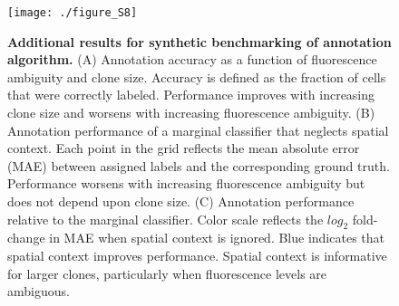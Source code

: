 \begin{figure}[h]
\texttt{[image: ./figure\_S8]}
\caption[Additional results for synthetic benchmarking of annotation algorithm.]{\textbf{Additional results for synthetic benchmarking of annotation algorithm.} (A) Annotation accuracy as a function of fluorescence ambiguity and clone size. Accuracy is defined as the fraction of cells that were correctly labeled. Performance improves with increasing clone size and worsens with increasing fluorescence ambiguity. (B) Annotation performance of a marginal classifier that neglects spatial context. Each point in the grid reflects the mean absolute error (MAE) between assigned labels and the corresponding ground truth. Performance worsens with increasing fluorescence ambiguity but does not depend upon clone size. (C) Annotation performance relative to the marginal classifier. Color scale reflects the $log_2$ fold-change in MAE when spatial context is ignored. Blue indicates that spatial context improves performance. Spatial context is informative for larger clones, particularly when fluorescence levels are ambiguous.}
\label{fig:clones:figS8}
\end{figure}
